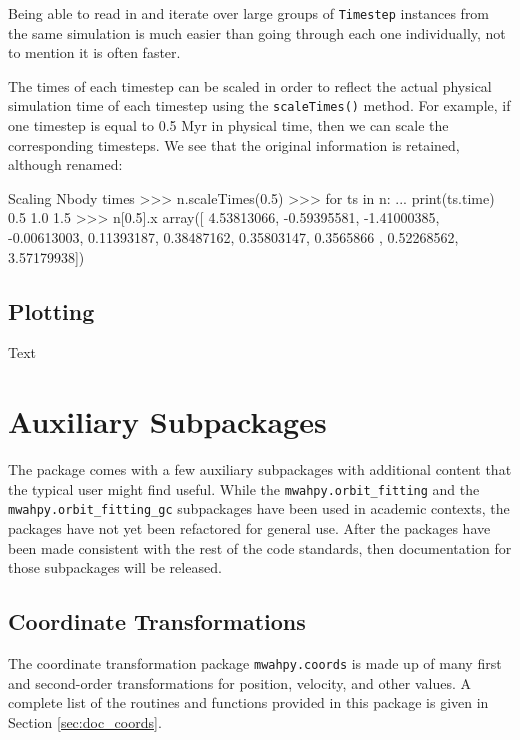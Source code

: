 \documentclass{article}
\begin{document}
Being able to read in and iterate over large groups of \verb!Timestep! instances from the same simulation is much easier than going through each one individually, not to mention it is often faster. 

The times of each timestep can be scaled in order to reflect the actual physical simulation time of each timestep using the \verb!scaleTimes()! method. For example, if one timestep is equal to 0.5 Myr in physical time, then we can scale the corresponding timesteps. We see that the original information is retained, although renamed: \\

\begin{codelisting}{Scaling Nbody times}
>>> n.scaleTimes(0.5)
>>> for ts in n:
...     print(ts.time)
0.5
1.0
1.5
>>> n[0.5].x
array([ 4.53813066, -0.59395581, -1.41000385, -0.00613003,  0.11393187,
        0.38487162,  0.35803147,  0.3565866 ,  0.52268562,  3.57179938])
\end{codelisting}

\subsection{Plotting}

Text

\section{Auxiliary Subpackages}

The \mwahpy package comes with a few auxiliary subpackages with additional content that the typical user might find useful. While the \verb!mwahpy.orbit_fitting! and the \verb!mwahpy.orbit_fitting_gc! subpackages have been used in academic contexts, the packages have not yet been refactored for general use. After the packages have been made consistent with the rest of the \mwahpy code standards, then documentation for those subpackages will be released. 

\subsection{Coordinate Transformations}

The coordinate transformation package \verb!mwahpy.coords! is made up of many first and second-order transformations for position, velocity, and other values. A complete list of the routines and functions provided in this package is given in Section \ref{sec:doc_coords}. 
\end{document}
